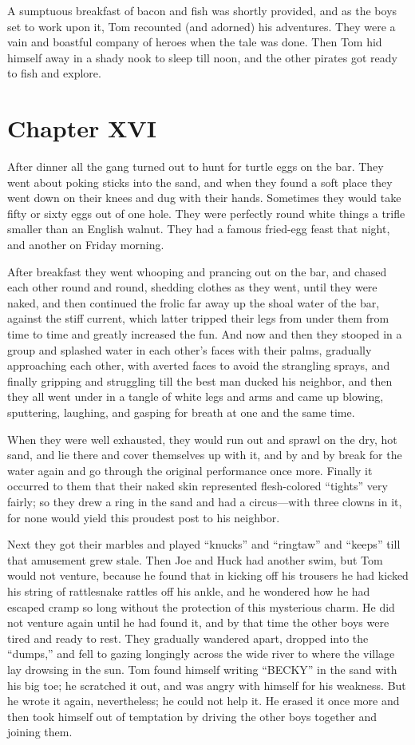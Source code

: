 \documentclass{book}
\begin{document}
A sumptuous breakfast of bacon and fish was shortly provided, and as the boys set to work upon it, Tom recounted (and adorned) his adventures. They were a vain and boastful company of heroes when the tale was done. Then Tom hid himself away in a shady nook to sleep till noon, and the other pirates got ready to fish and explore.

\chapter*{Chapter XVI}

After dinner all the gang turned out to hunt for turtle eggs on the bar. They went about poking sticks into the sand, and when they found a soft place they went down on their knees and dug with their hands. Sometimes they would take fifty or sixty eggs out of one hole. They were perfectly round white things a trifle smaller than an English walnut. They had a famous fried-egg feast that night, and another on Friday morning.

After breakfast they went whooping and prancing out on the bar, and chased each other round and round, shedding clothes as they went, until they were naked, and then continued the frolic far away up the shoal water of the bar, against the stiff current, which latter tripped their legs from under them from time to time and greatly increased the fun. And now and then they stooped in a group and splashed water in each other’s faces with their palms, gradually approaching each other, with averted faces to avoid the strangling sprays, and finally gripping and struggling till the best man ducked his neighbor, and then they all went under in a tangle of white legs and arms and came up blowing, sputtering, laughing, and gasping for breath at one and the same time.

When they were well exhausted, they would run out and sprawl on the dry, hot sand, and lie there and cover themselves up with it, and by and by break for the water again and go through the original performance once more. Finally it occurred to them that their naked skin represented flesh-colored “tights” very fairly; so they drew a ring in the sand and had a circus—with three clowns in it, for none would yield this proudest post to his neighbor.

Next they got their marbles and played “knucks” and “ringtaw” and “keeps” till that amusement grew stale. Then Joe and Huck had another swim, but Tom would not venture, because he found that in kicking off his trousers he had kicked his string of rattlesnake rattles off his ankle, and he wondered how he had escaped cramp so long without the protection of this mysterious charm. He did not venture again until he had found it, and by that time the other boys were tired and ready to rest. They gradually wandered apart, dropped into the “dumps,” and fell to gazing longingly across the wide river to where the village lay drowsing in the sun. Tom found himself writing “BECKY” in the sand with his big toe; he scratched it out, and was angry with himself for his weakness. But he wrote it again, nevertheless; he could not help it. He erased it once more and then took himself out of temptation by driving the other boys together and joining them.
\end{document}
